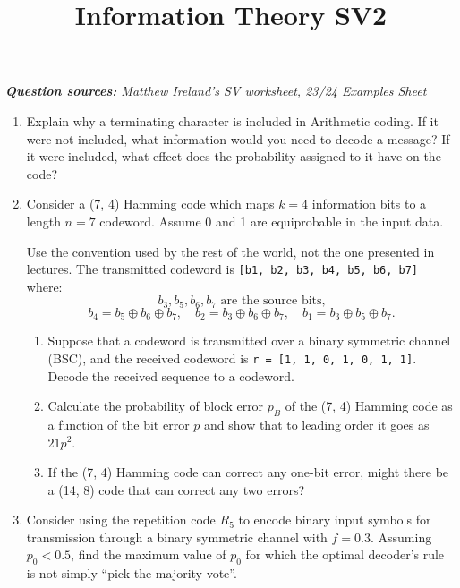 \documentclass[11pt,a4paper]{article}
\title{Information Theory SV2}
\author{}
\date{}
\begin{document}
\maketitle

\emph{
\textbf{Question sources:} Matthew Ireland's SV worksheet, 23/24 Examples Sheet}

\begin{enumerate}

\item  Explain why a terminating character is included in Arithmetic coding.  
    If it were not included, what information would you need to decode a message?  
    If it were included, what effect does the probability assigned to it have on the code?

    \item Consider a (7, 4) Hamming code which maps $k=4$ information bits to a length $n=7$ codeword.  
    Assume 0 and 1 are equiprobable in the input data.  

    Use the convention used by the rest of the world, not the one presented in lectures.  
    The transmitted codeword is \verb|[b1, b2, b3, b4, b5, b6, b7]| where:
    \[
    b_3, b_5, b_6, b_7 \text{ are the source bits,}
    \]
    \[
    b_4 = b_5 \oplus b_6 \oplus b_7, \quad
    b_2 = b_3 \oplus b_6 \oplus b_7, \quad
    b_1 = b_3 \oplus b_5 \oplus b_7.
    \]

    \begin{enumerate}
        \item Suppose that a codeword is transmitted over a binary symmetric channel (BSC), and the received codeword is  
        \verb|r = [1, 1, 0, 1, 0, 1, 1]|. Decode the received sequence to a codeword.

        \item Calculate the probability of block error $p_B$ of the (7, 4) Hamming code as a function of the bit error $p$ and show that to leading order it goes as $21p^2$.

        \item If the (7, 4) Hamming code can correct any one-bit error, might there be a (14, 8) code that can correct any two errors?
    \end{enumerate}

    \item Consider using the repetition code $R_5$ to encode binary input symbols for transmission through a binary symmetric channel with $f = 0.3$.  
    Assuming $p_0 < 0.5$, find the maximum value of $p_0$ for which the optimal decoder’s rule is not simply “pick the majority vote”.


\end{enumerate}
\end{document}
